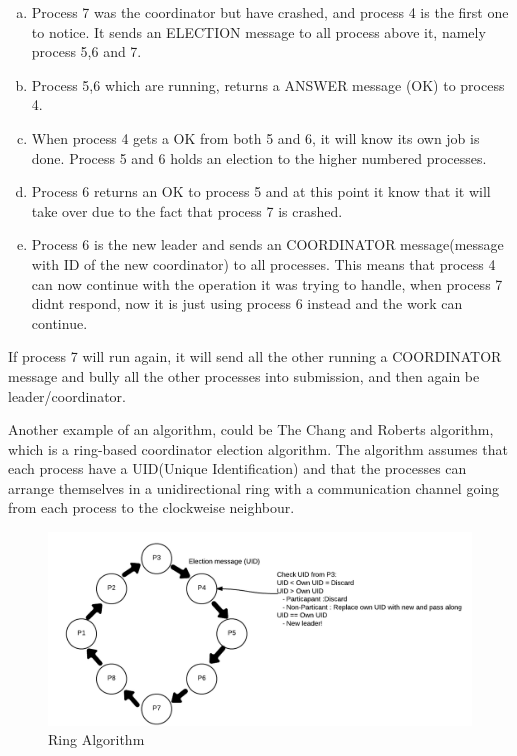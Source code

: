 \documentclass[Main]{subfiles}
\begin{document}
\begin{enumerate}[a)]
\item Process 7 was the coordinator but have crashed, and process 4 is the first one to notice. It sends an ELECTION message to all process above it, namely process 5,6 and 7.  
\item Process 5,6 which are running, returns a ANSWER message (OK) to process 4. 
\item When process 4 gets a OK from both 5 and 6, it will know its own job is done. Process 5 and 6 holds an election to the higher numbered processes. 
\item Process 6 returns an OK to process 5 and at this point it know that it will take over due to the fact that process 7 is crashed. 
\item Process 6 is the new leader and sends an COORDINATOR message(message with ID of the new coordinator) to all processes. This means that process 4 can now continue with the operation it was trying to handle, when process 7 didnt respond, now it is just using process 6 instead and the work can continue. 
\end{enumerate}

If process 7 will run again, it will send all the other running a COORDINATOR message and bully all the other processes into submission, and then again be leader/coordinator. \cite{ElectionAlgorithm} 

Another example of an algorithm, could be The Chang and Roberts algorithm, which is a ring-based coordinator election algorithm. The algorithm assumes that each process have a UID(Unique Identification) and that the processes can arrange themselves in a unidirectional ring with a communication channel going from each process to the clockweise neighbour.

\begin{figure}[hbtp]
\centering
\includegraphics[scale=0.30]{Figurer/ChangAndRobertsRingAlgorithm.png}
\caption{Ring Algorithm}
\end{figure}
\end{document}
